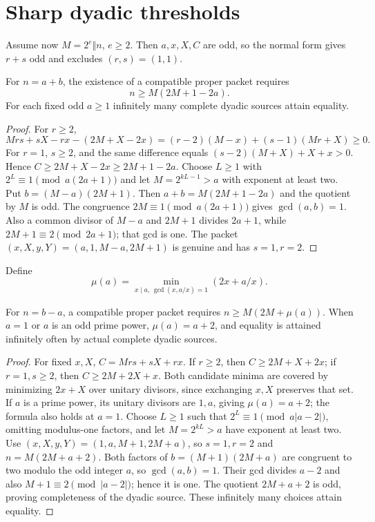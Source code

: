 \section{Sharp dyadic thresholds}
Assume now $M=2^e\Vert n$, $e\ge2$. Then $a,x,X,C$ are odd, so the normal form gives $r+s$ odd and excludes $(r,s)=(1,1)$.
\begin{theorem}\label{normal:thm:plus}
For $n=a+b$, the existence of a compatible proper packet requires
\[
 n\ge M(2M+1-2a).
\]
For each fixed odd $a\ge1$ infinitely many complete dyadic sources attain equality.
\end{theorem}
\begin{proof}
For $r\ge2$,
\[
 Mrs+sX-rx-(2M+X-2x)=(r-2)(M-x)+(s-1)(Mr+X)\ge0.
\]
For $r=1$, $s\ge2$, and the same difference equals $(s-2)(M+X)+X+x>0$. Hence $C\ge2M+X-2x\ge2M+1-2a$.
Choose $L\ge1$ with $2^L\equiv1\pmod{a(2a+1)}$ and let $M=2^{kL-1}>a$ with exponent at least two. Put $b=(M-a)(2M+1)$. Then $a+b=M(2M+1-2a)$ and the quotient by $M$ is odd. The congruence $2M\equiv1\pmod{a(2a+1)}$ gives $\gcd(a,b)=1$. Also a common divisor of $M-a$ and $2M+1$ divides $2a+1$, while $2M+1\equiv2\pmod{2a+1}$; that gcd is one. The packet $(x,X,y,Y)=(a,1,M-a,2M+1)$ is genuine and has $s=1,r=2$.
\end{proof}
Define
\[
 \mu(a)=\min_{x\mid a,\,\gcd(x,a/x)=1}(2x+a/x).
\]
\begin{theorem}\label{normal:thm:minus}
For $n=b-a$, a compatible proper packet requires $n\ge M(2M+\mu(a))$. When $a=1$ or $a$ is an odd prime power, $\mu(a)=a+2$, and equality is attained infinitely often by actual complete dyadic sources.
\end{theorem}
\begin{proof}
For fixed $x,X$, $C=Mrs+sX+rx$. If $r\ge2$, then $C\ge2M+X+2x$; if $r=1,s\ge2$, then $C\ge2M+2X+x$. Both candidate minima are covered by minimizing $2x+X$ over unitary divisors, since exchanging $x,X$ preserves that set. If $a$ is a prime power, its unitary divisors are $1,a$, giving $\mu(a)=a+2$; the formula also holds at $a=1$.
Choose $L\ge1$ such that $2^L\equiv1\pmod{a|a-2|}$, omitting modulus-one factors, and let $M=2^{kL}>a$ have exponent at least two. Use $(x,X,y,Y)=(1,a,M+1,2M+a)$, so $s=1,r=2$ and $n=M(2M+a+2)$. Both factors of $b=(M+1)(2M+a)$ are congruent to two modulo the odd integer $a$, so $\gcd(a,b)=1$. Their gcd divides $a-2$ and also $M+1\equiv2\pmod{|a-2|}$; hence it is one. The quotient $2M+a+2$ is odd, proving completeness of the dyadic source. These infinitely many choices attain equality.
\end{proof}

